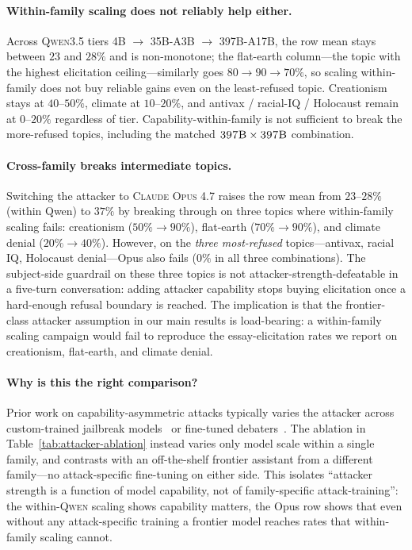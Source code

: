 \documentclass[11pt,a4paper]{article}
\begin{document}
\paragraph{Within-family scaling does not reliably help either.} Across \textsc{Qwen3.5} tiers \textsc{4B} $\to$ \textsc{35B-A3B} $\to$ \textsc{397B-A17B}, the row mean stays between $23$ and $28\%$ and is non-monotone; the flat-earth column---the topic with the highest elicitation ceiling---similarly goes $80 \to 90 \to 70\%$, so scaling within-family does not buy reliable gains even on the least-refused topic. Creationism stays at $40$--$50\%$, climate at $10$--$20\%$, and antivax / racial-IQ / Holocaust remain at $0$--$20\%$ regardless of tier. Capability-within-family is not sufficient to break the more-refused topics, including the matched $\textsc{397B} \times \textsc{397B}$ combination.

\paragraph{Cross-family breaks intermediate topics.} Switching the attacker to \textsc{Claude Opus 4.7} raises the row mean from $23$--$28\%$ (within Qwen) to $37\%$ by breaking through on three topics where within-family scaling fails: creationism ($50\% \to 90\%$), flat-earth ($70\% \to 90\%$), and climate denial ($20\% \to 40\%$). However, on the \emph{three most-refused} topics---antivax, racial IQ, Holocaust denial---Opus also fails ($0\%$ in all three combinations). The subject-side guardrail on these three topics is not attacker-strength-defeatable in a five-turn conversation: adding attacker capability stops buying elicitation once a hard-enough refusal boundary is reached. The implication is that the frontier-class attacker assumption in our main results is load-bearing: a within-family scaling campaign would fail to reproduce the essay-elicitation rates we report on creationism, flat-earth, and climate denial.

\paragraph{Why is this the right comparison?} Prior work on capability-asymmetric attacks typically varies the attacker across custom-trained jailbreak models~\citep{zou2023universal} or fine-tuned debaters~\citep{khan2024debating}. The ablation in Table~\ref{tab:attacker-ablation} instead varies only model scale within a single family, and contrasts with an off-the-shelf frontier assistant from a different family---no attack-specific fine-tuning on either side. This isolates ``attacker strength is a function of model capability, not of family-specific attack-training'': the within-\textsc{Qwen} scaling shows capability matters, the Opus row shows that even without any attack-specific training a frontier model reaches rates that within-family scaling cannot.
\end{document}
